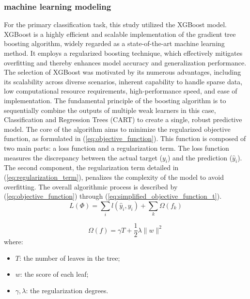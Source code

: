\subsubsection{machine learning modeling}
For the primary classification task, this study utilized the XGBoost model\cite{mthd05}. XGBoost is a highly efficient and scalable implementation of the gradient tree boosting algorithm, widely regarded as a state-of-the-art machine learning method. It employs a regularized boosting technique, which effectively mitigates overfitting and thereby enhances model accuracy and generalization performance. The selection of XGBoost was motivated by its numerous advantages, including its scalability across diverse scenarios, inherent capability to handle sparse data, low computational resource requirements, high-performance speed, and ease of implementation. The fundamental principle of the boosting algorithm is to sequentially combine the outputs of multiple weak learners in this case, Classification and Regression Trees (CART) to create a single, robust predictive model. The core of the algorithm aims to minimize the regularized objective function, as formulated in (\ref{eq:objective_function}). This function is composed of two main parts: a loss function and a regularization term. The loss function measures the discrepancy between the actual target ($y_i$) and the prediction ($\hat{y}_i$). The second component, the regularization term detailed in (\ref{eq:regularization_term}), penalizes the complexity of the model to avoid overfitting. The overall algorithmic process is described by (\ref{eq:objective_function}) through (\ref{eq:simplified_objective_function_t}).
\begin{equation} \label{eq:objective_function}
L(\Phi) = \sum_i l(\hat{y}_i, y_i) + \sum_k \Omega(f_k)
\end{equation}

\begin{equation} \label{eq:regularization_term}
\Omega(f) = \gamma T + \frac{1}{2} \lambda \|w\|^2
\end{equation}
where:
\begin{itemize}
    \item $T$: the number of leaves in the tree;
    \item $w$: the score of each leaf;
    \item $\gamma, \lambda$: the regularization degrees.
\end{itemize}

